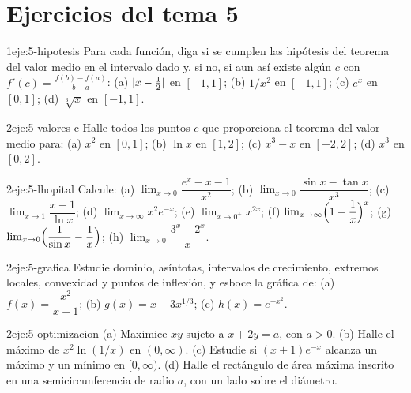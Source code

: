 \section*{Ejercicios del tema 5}

\begin{ejercicio}{1}{eje:5-hipotesis}
Para cada función, diga si se cumplen las hipótesis del teorema del valor medio en el intervalo dado y, si no, si aun así existe algún $c$ con $f'(c)=\frac{f(b)-f(a)}{b-a}$: (a) $\lvert x-\tfrac12\rvert$ en $[-1,1]$; (b) $1/x^{2}$ en $[-1,1]$; (c) $e^{x}$ en $[0,1]$; (d) $\sqrt[3]{x}$ en $[-1,1]$.
\end{ejercicio}

\begin{ejercicio}{2}{eje:5-valores-c}
Halle todos los puntos $c$ que proporciona el teorema del valor medio para: (a) $x^{2}$ en $[0,1]$; (b) $\ln x$ en $[1,2]$; (c) $x^{3}-x$ en $[-2,2]$; (d) $x^{3}$ en $[0,2]$.
\end{ejercicio}

\begin{ejercicio}{2}{eje:5-lhopital}
Calcule: (a) $\lim_{x\to0}\dfrac{e^{x}-x-1}{x^{2}}$; (b) $\lim_{x\to0}\dfrac{\sin x-\tan x}{x^{3}}$; (c) $\lim_{x\to1}\dfrac{x-1}{\ln x}$; (d) $\lim_{x\to\infty}x^{2}e^{-x}$; (e) $\lim_{x\to0^{+}}x^{2x}$; (f) $\lim_{x\to\infty}\Bigl(1-\dfrac1x\Bigr)^{x}$; (g) $\lim_{x\to0}\Bigl(\dfrac{1}{\sin x}-\dfrac1x\Bigr)$; (h) $\lim_{x\to0}\dfrac{3^{x}-2^{x}}{x}$.
\end{ejercicio}

\begin{ejercicio}{2}{eje:5-grafica}
Estudie dominio, asíntotas, intervalos de crecimiento, extremos locales, convexidad y puntos de inflexión, y esboce la gráfica de: (a) $f(x)=\dfrac{x^{2}}{x-1}$; (b) $g(x)=x-3x^{1/3}$; (c) $h(x)=e^{-x^{2}}$.
\end{ejercicio}

\begin{ejercicio}{2}{eje:5-optimizacion}
(a) Maximice $xy$ sujeto a $x+2y=a$, con $a>0$. (b) Halle el máximo de $x^{2}\ln(1/x)$ en $(0,\infty)$. (c) Estudie si $(x+1)e^{-x}$ alcanza un máximo y un mínimo en $[0,\infty)$. (d) Halle el rectángulo de área máxima inscrito en una semicircunferencia de radio $a$, con un lado sobre el diámetro.
\end{ejercicio}

